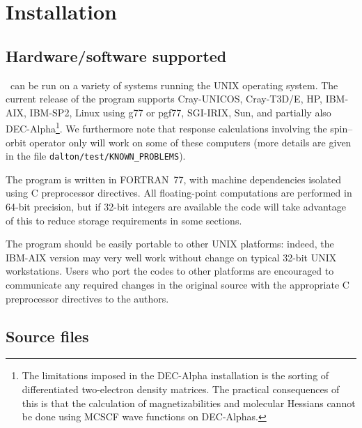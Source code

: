 \chapter{Installation}\label{ch:install}

\section{Hardware/software
supported}\label{sec:hardsoft}

\dalton\ can be run on a variety of systems running the UNIX operating
system.  The current release of the program supports
Cray-UNICOS,
Cray-T3D/E,
HP,
IBM-AIX,
IBM-SP2,
Linux using g77 or pgf77,
SGI-IRIX,
Sun,
and partially also
DEC-Alpha\footnote{The limitations imposed in the
DEC-Alpha installation is the sorting of differentiated two-electron
density matrices. The practical consequences of this is that the
calculation of magnetizabilities and molecular
Hessians cannot be done
using MCSCF wave functions on DEC-Alphas.}.
We furthermore note that response calculations involving the
spin--orbit operator only will work on some of these
computers (more details are given in the file
\verb|dalton/test/KNOWN_PROBLEMS|).

The program is written in FORTRAN~77, with
machine dependencies isolated using C preprocessor directives.  All floating-point computations are
performed in 64-bit precision, but if 32-bit integers are
available the code will take advantage of this to reduce storage
requirements in some sections.

The program should be easily portable to other UNIX
platforms: indeed, the IBM-AIX version
may very well work without change on typical 32-bit UNIX workstations.
Users who port the codes to other platforms are encouraged to
communicate any required changes in the original source with the
appropriate C preprocessor directives to the authors.

\section{Source files}\label{sec:source}

